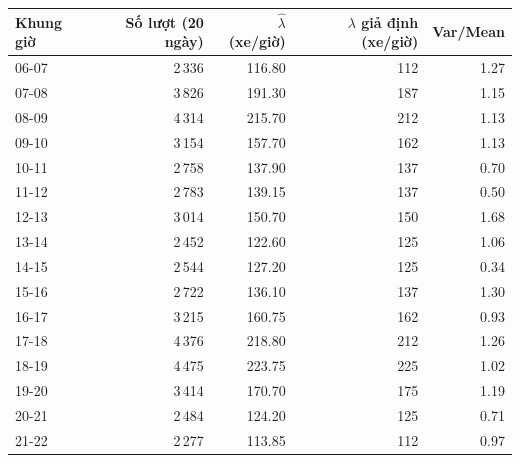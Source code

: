 \begin{tabular}{lrrrr}
\toprule
\textbf{Khung giờ} & \textbf{Số lượt (20 ngày)} & \textbf{$\hat{\lambda}$ (xe/giờ)} & \textbf{$\lambda$ giả định (xe/giờ)} & \textbf{Var/Mean} \\
\midrule
06-07 & 2\,336 & 116.80 & 112 & 1.27 \\
07-08 & 3\,826 & 191.30 & 187 & 1.15 \\
08-09 & 4\,314 & 215.70 & 212 & 1.13 \\
09-10 & 3\,154 & 157.70 & 162 & 1.13 \\
10-11 & 2\,758 & 137.90 & 137 & 0.70 \\
11-12 & 2\,783 & 139.15 & 137 & 0.50 \\
12-13 & 3\,014 & 150.70 & 150 & 1.68 \\
13-14 & 2\,452 & 122.60 & 125 & 1.06 \\
14-15 & 2\,544 & 127.20 & 125 & 0.34 \\
15-16 & 2\,722 & 136.10 & 137 & 1.30 \\
16-17 & 3\,215 & 160.75 & 162 & 0.93 \\
17-18 & 4\,376 & 218.80 & 212 & 1.26 \\
18-19 & 4\,475 & 223.75 & 225 & 1.02 \\
19-20 & 3\,414 & 170.70 & 175 & 1.19 \\
20-21 & 2\,484 & 124.20 & 125 & 0.71 \\
21-22 & 2\,277 & 113.85 & 112 & 0.97 \\
\bottomrule
\end{tabular}
